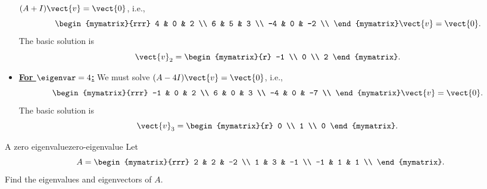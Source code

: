 \begin{solution}
\begin{itemize}
    $(A+I)\/\vect{v}=\vect{0}$, i.e.,
    \begin{equation*}
      \begin{mymatrix}{rrr}
        4  & 0 &  2 \\
        6  & 5 &  3 \\
        -4 & 0 & -2 \\
      \end{mymatrix}\vect{v}=\vect{0}.
    \end{equation*}
    The basic solution is
    \begin{equation*}
      \vect{v}_2 = \begin{mymatrix}{r} -1 \\ 0 \\ 2 \end{mymatrix}.
    \end{equation*}
  \item {\bf{\underline{For $\eigenvar=4$:}}} We must solve
    $(A-4I)\vect{v}=\vect{0}$, i.e.,
    \begin{equation*}
      \begin{mymatrix}{rrr}
        -1  & 0 &  2 \\
        6  & 0 &  3 \\
        -4 & 0 & -7 \\
      \end{mymatrix}\vect{v}=\vect{0}.
    \end{equation*}
    The basic solution is
    \begin{equation*}
      \vect{v}_3 = \begin{mymatrix}{r} 0 \\ 1 \\ 0 \end{mymatrix}.
    \end{equation*}
  \end{itemize}
\end{solution}

\begin{example}{A zero eigenvalue}{zero-eigenvalue}
  Let
  \begin{equation*}
    A=\begin{mymatrix}{rrr}
      2 & 2 & -2 \\
      1 & 3 & -1 \\
      -1 & 1 & 1 \\
    \end{mymatrix}.
  \end{equation*}
  Find the eigenvalues and eigenvectors of $A$.
\end{example}

